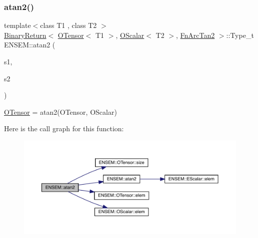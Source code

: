 \subsubsection{\texorpdfstring{atan2()}{atan2()}\hspace{0.1cm}{\footnotesize\ttfamily [2/3]}}
{\footnotesize\ttfamily template$<$class T1 , class T2 $>$ \\
\mbox{\hyperlink{structENSEM_1_1BinaryReturn}{Binary\+Return}}$<$ \mbox{\hyperlink{classENSEM_1_1OTensor}{O\+Tensor}}$<$ T1 $>$, \mbox{\hyperlink{classENSEM_1_1OScalar}{O\+Scalar}}$<$ T2 $>$, \mbox{\hyperlink{structENSEM_1_1FnArcTan2}{Fn\+Arc\+Tan2}} $>$\+::Type\+\_\+t E\+N\+S\+E\+M\+::atan2 (\begin{DoxyParamCaption}\item[{const \mbox{\hyperlink{classENSEM_1_1OTensor}{O\+Tensor}}$<$ T1 $>$ \&}]{s1,  }\item[{const \mbox{\hyperlink{classENSEM_1_1OScalar}{O\+Scalar}}$<$ T2 $>$ \&}]{s2 }\end{DoxyParamCaption})\hspace{0.3cm}{\ttfamily [inline]}}



\mbox{\hyperlink{classENSEM_1_1OTensor}{O\+Tensor}} = atan2(\+O\+Tensor, O\+Scalar) 

Here is the call graph for this function\+:\nopagebreak
\begin{figure}[H]
\begin{center}
\leavevmode
\includegraphics[width=350pt]{de/d87/group__obstensor_gaba8ed2c3683bbcbda35e8a372d7ee2e6_cgraph}
\end{center}
\end{figure}
\mbox{\label{group__obstensor_ga81f7f5b4d6ba20b09ce1c6a2f7284657}} 
